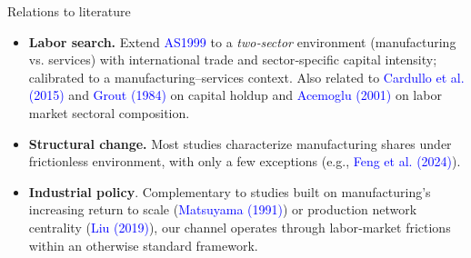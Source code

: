 \documentclass[9pt,xcolor={svgnames}]{beamer}
\begin{document}
\begin{frame}{Relations to literature}

\begin{itemize}
    \item \textbf{Labor search.}   Extend \textcolor{blue}{AS1999} to a \emph{two‐sector} environment (manufacturing vs. services) with international trade and sector‐specific capital intensity; calibrated to a manufacturing–services context. Also related to \textcolor{blue}{Cardullo et al. (2015)} and \textcolor{blue}{Grout (1984)} on capital holdup and \textcolor{blue}{Acemoglu (2001)} on labor market sectoral composition.

    \medskip

    \item \textbf{Structural change.} Most studies   characterize manufacturing shares under frictionless environment, with only a few exceptions (e.g., \textcolor{blue}{Feng et al. (2024)}). %

\medskip

    \item \textbf{Industrial policy}.  Complementary to studies built on manufacturing's increasing return to scale (\textcolor{blue}{Matsuyama (1991)}) or production network centrality (\textcolor{blue}{Liu (2019)}), our channel operates through labor‐market frictions within an otherwise standard framework.
\end{itemize}

\end{frame}
\end{document}
